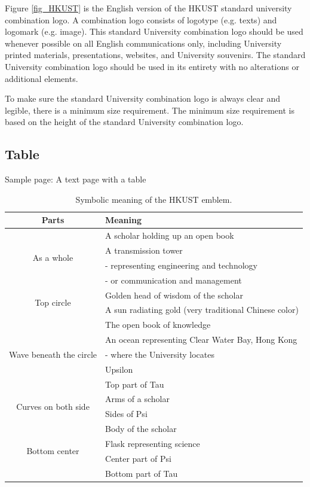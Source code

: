 Figure \ref{fig_HKUST} is the English version of the HKUST standard university combination logo. A combination logo consists of logotype (e.g. texts) and logomark (e.g. image).
This standard University combination logo should be used whenever possible
on all English communications only, including University printed materials,
presentations, websites, and University souvenirs. The standard University combination logo should be used in its entirety with no alterations or additional elements.

To make sure the standard University combination logo is always clear and legible, there is a minimum size requirement. 
The minimum size requirement is based on the height of the standard University combination logo.

\subsection{Table}
Sample page: A text page with a table 

\begin{table}[htb]
\caption{Symbolic meaning of the HKUST emblem.}
\centering

\begin{tabular}{|c|l|}
\hline Parts & Meaning \\
\hline
\multirow{4}{*}{As a whole}& A scholar holding up an open book \\ 
& A transmission tower \\
& - representing engineering and technology \\
& - or communication and management \\ \hline
\multirow{2}{*}{Top circle}& Golden head of wisdom of the scholar\\
& A sun radiating gold (very traditional Chinese color)\\ \hline
\multirow{5}{*}{Wave beneath the circle} & The open book of knowledge\\
& An ocean representing Clear Water Bay, Hong Kong \\
& - where the University locates\\ 
& Upsilon \\ 
& Top part of Tau \\\hline
\multirow{2}{*}{Curves on both side}  & Arms of a scholar\\
& Sides of Psi \\ \hline
\multirow{4}{*}{Bottom center}  & Body of the scholar\\
& Flask representing science\\
& Center part of Psi \\
& Bottom part of Tau \\ \hline
\end{tabular}
\label{tbl_wmt17-segrr}
\end{table}

